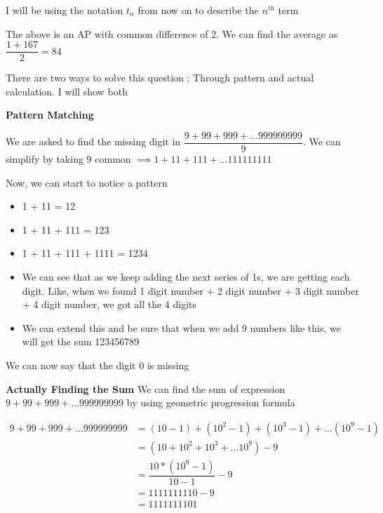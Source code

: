 \begin{NOTE}
    I will be using the notation $t_n$ from now on to describe the $n^{th}$ term
\end{NOTE}


The above is an AP with common difference of 2. We can find the average as $\dfrac{1 + 167}{2} = 84$

\newpage


There are two ways to solve this question : Through pattern and actual calculation. I will show both

\textbf{Pattern Matching}

We are asked to find the missing digit in $\dfrac{9 + 99 + 999 + \ldots 999999999}{9}$. We can simplify by taking 9 common $\implies 1 + 11 + 111 + \ldots 111111111$

Now, we can start to notice a pattern
\begin{itemize}
    \item 1 + 11 = 12
    \item 1 + 11 + 111 = 123
    \item 1 + 11 + 111 + 1111 = 1234
    \item We can see that as we keep adding the next series of 1s, we are getting each digit. Like, when we found 1 digit number + 2 digit number + 3 digit number + 4 digit number, we got all the 4 digits
    \item We can extend this and be sure that when we add 9 numbers like this, we will get the sum 123456789
\end{itemize}

We can now say that the digit 0 is missing    

\textbf{Actually Finding the Sum}
We can find the sum of expression $9 + 99 + 999 + \ldots 999999999$ by using geometric progression formula

\begin{align*}
    9 + 99 + 999 + \ldots 999999999 &= (10 - 1) + (10^2 - 1) + (10^3 - 1) + \ldots (10^9 - 1) \\
    &= (10 + 10^2 + 10^3 + \ldots 10^9 ) - 9 \tag{There are nine "1"} \\
    &= \dfrac{10 * (10^9 - 1)}{10 - 1} - 9 \tag{GP sum formula with $r = 10$ and $n = 9$} \\
    &= 1111111110 - 9 \\
    &= 1111111101
\end{align*}


